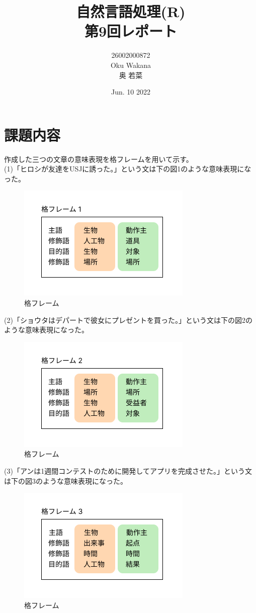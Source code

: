 \documentclass[dvipdfmx,autodetect-engine,titlepage]{jsarticle}
\title{自然言語処理(R)\\
第9回レポート\\
}
\author{26002000872\\Oku Wakana\\奥 若菜}
\date{Jun. 10 2022}
\begin{document}
\maketitle

\section{課題内容}
作成した三つの文章の意味表現を格フレームを用いて示す。\\

(1)「ヒロシが友達をUSJに誘った。」という文は下の図1のような意味表現になった。
 \begin{figure}[H]
    \centering
    \includegraphics[scale=0.6]{kaku1.png}
    \caption{格フレーム}\label{fig:図1}
\end{figure}


(2)「ショウタはデパートで彼女にプレゼントを買った。」という文は下の図2のような意味表現になった。
 \begin{figure}[H]
    \centering
    \includegraphics[scale=0.6]{kaku2.png}
    \caption{格フレーム}\label{fig:図2}
\end{figure}


(3)「アンは1週間コンテストのために開発してアプリを完成させた。」という文は下の図3のような意味表現になった。
 \begin{figure}[H]
    \centering
    \includegraphics[scale=0.6]{kaku3.png}
    \caption{格フレーム}\label{fig:図3}
\end{figure}
\end{document}
